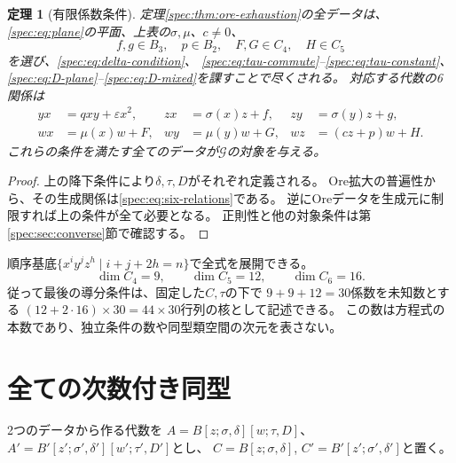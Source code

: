 \documentclass[11pt,a4paper]{ltjsarticle}
\newtheorem{theorem}{定理}[section]
\theoremstyle{definition}
\newcommand{\Gclass}{\mathcal G}
\begin{document}
\begin{theorem}[有限係数条件]\label{spec:thm:coefficient-data}
定理\ref{spec:thm:ore-exhaustion}の全データは、
\eqref{spec:eq:plane}の平面、上表の$\sigma,\mu$、$c\ne0$、
\[
f,g\in B_3,\quad p\in B_2,\quad F,G\in C_4,\quad H\in C_5
\]
を選び、\eqref{spec:eq:delta-condition}、
\eqref{spec:eq:tau-commute}--\eqref{spec:eq:tau-constant}、
\eqref{spec:eq:D-plane}--\eqref{spec:eq:D-mixed}を課すことで尽くされる。
対応する代数の6関係は
\begin{equation}\label{spec:eq:six-relations}
\begin{aligned}
yx&=qxy+\varepsilon x^2,&
zx&=\sigma(x)z+f,& zy&=\sigma(y)z+g,\\
wx&=\mu(x)w+F,&
wy&=\mu(y)w+G,& wz&=(cz+p)w+H.
\end{aligned}
\end{equation}
これらの条件を満たす全てのデータが$\Gclass$の対象を与える。
\end{theorem}
\begin{proof}
上の降下条件により$\delta,\tau,D$がそれぞれ定義される。
Ore拡大の普遍性から、その生成関係は\eqref{spec:eq:six-relations}である。
逆にOreデータを生成元に制限すれば上の条件が全て必要となる。
正則性と他の対象条件は第\ref{spec:sec:converse}節で確認する。
\end{proof}

順序基底$\{x^iy^jz^h\mid i+j+2h=n\}$で全式を展開できる。
\[
\dim C_4=9,\qquad \dim C_5=12,\qquad \dim C_6=16.
\]
従って最後の導分条件は、固定した$C,\tau$の下で
$9+9+12=30$係数を未知数とする
$(12+2\cdot16)\times30=44\times30$行列の核として記述できる。
この数は方程式の本数であり、独立条件の数や同型類空間の次元を表さない。

\section{全ての次数付き同型}\label{spec:sec:isomorphism}
2つのデータから作る代数を
$A=B[z;\sigma,\delta][w;\tau,D]$、
$A'=B'[z';\sigma',\delta'][w';\tau',D']$とし、
$C=B[z;\sigma,\delta]$, $C'=B'[z';\sigma',\delta']$と置く。
\end{document}
